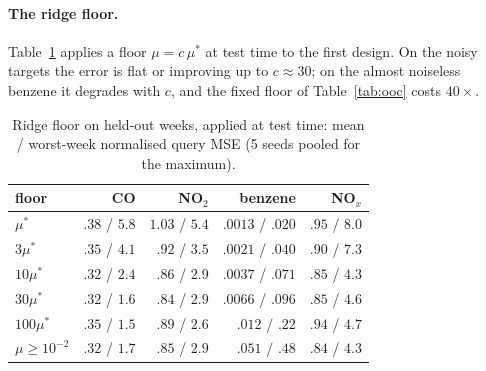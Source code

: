 \documentclass[fullpaper,final]{nldl}
\theoremstyle{plain}
\theoremstyle{definition}
\begin{document}
\paragraph{The ridge floor.} Table~\ref{tab:relfloor} applies a floor $\mu =
c\,\mu^\ast$ at test time to the first design. On the noisy targets the error is
flat or improving up to $c \approx 30$; on the almost noiseless benzene it degrades
with $c$, and the fixed floor of Table~\ref{tab:ooc} costs $40\times$.

\begin{table}[tb]
\centering
\caption{Ridge floor on held-out weeks, applied at test time: mean / worst-week
normalised query MSE (5 seeds pooled for the maximum).}
\label{tab:relfloor}
\footnotesize
\setlength{\tabcolsep}{2pt}
\begin{tabular}{lrrrr}
\toprule
floor & CO & NO$_2$ & benzene & NO$_x$ \\
\midrule
$\mu^\ast$          & $.38$ / $5.8$ & $1.03$ / $5.4$ & $.0013$ / $.020$ & $.95$ / $8.0$ \\
$3\mu^\ast$         & $.35$ / $4.1$ & $.92$ / $3.5$  & $.0021$ / $.040$ & $.90$ / $7.3$ \\
$10\mu^\ast$        & $.32$ / $2.4$ & $.86$ / $2.9$  & $.0037$ / $.071$ & $.85$ / $4.3$ \\
$30\mu^\ast$        & $.32$ / $1.6$ & $.84$ / $2.9$  & $.0066$ / $.096$ & $.85$ / $4.6$ \\
$100\mu^\ast$       & $.35$ / $1.5$ & $.89$ / $2.6$  & $.012$ / $.22$   & $.94$ / $4.7$ \\
$\mu \geq 10^{-2}$  & $.32$ / $1.7$ & $.85$ / $2.9$  & $.051$ / $.48$   & $.84$ / $4.3$ \\
\bottomrule
\end{tabular}
\end{table}
\end{document}
